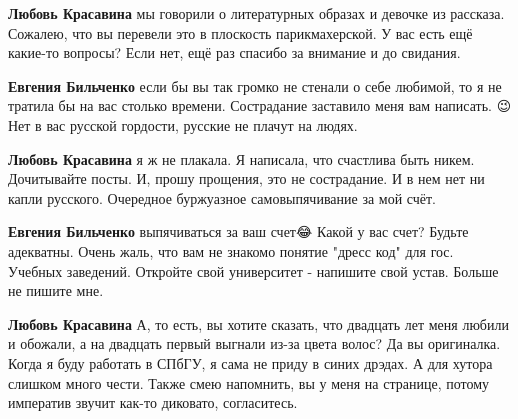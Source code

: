 \begin{itemize}
\begin{itemize}
 
\textbf{Любовь Красавина} мы говорили о литературных образах и девочке из рассказа. Сожалею, что вы перевели это в плоскость парикмахерской. У вас есть ещё какие-то вопросы? Если нет, ещё раз спасибо за внимание и до свидания.

 
\textbf{Евгения Бильченко} если бы вы так громко не стенали о себе любимой, то
я не тратила бы на вас столько времени. Сострадание заставило меня вам
написать. 😉 Нет в вас русской гордости, русские не плачут на людях.

 
\textbf{Любовь Красавина} я ж не плакала. Я написала, что счастлива быть никем. Дочитывайте посты. И, прошу прощения, это не сострадание. И в нем нет ни капли русского. Очередное буржуазное самовыпячивание за мой счёт.

 
\textbf{Евгения Бильченко} выпячиваться за ваш счет😂
Какой у вас счет?
Будьте адекватны.
Очень жаль, что вам не знакомо понятие "дресс код" для гос. Учебных заведений. Откройте свой университет - напишите свой устав.
Больше не пишите мне.

 
\textbf{Любовь Красавина} А, то есть, вы хотите сказать, что двадцать лет меня любили и обожали, а на двадцать первый выгнали из-за цвета волос? Да вы оригиналка. Когда я буду работать в СПбГУ, я сама не приду в синих дрэдах. А для хутора слишком много чести. Также смею напомнить, вы у меня на странице, потому императив звучит как-то диковато, согласитесь.


\end{itemize}
\end{itemize}
